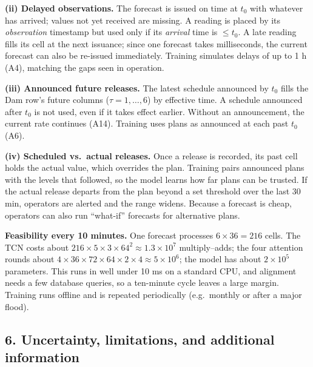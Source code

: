 \textbf{(ii) Delayed observations.} The forecast is issued on time at $t_0$ with whatever has arrived; values not yet received are missing. A reading is placed by its \emph{observation} timestamp but used only if its \emph{arrival} time is $\le t_0$. A late reading fills its cell at the next issuance; since one forecast takes milliseconds, the current forecast can also be re-issued immediately. Training simulates delays of up to 1 h (A4), matching the gaps seen in operation.

\textbf{(iii) Announced future releases.} The latest schedule announced by $t_0$ fills the Dam row's future columns ($\tau=1,\dots,6$) by effective time. A schedule announced after $t_0$ is not used, even if it takes effect earlier. Without an announcement, the current rate continues (A14). Training uses plans as announced at each past $t_0$ (A6).

\textbf{(iv) Scheduled vs.\ actual releases.} Once a release is recorded, its past cell holds the actual value, which overrides the plan. Training pairs announced plans with the levels that followed, so the model learns how far plans can be trusted. If the actual release departs from the plan beyond a set threshold over the last 30 min, operators are alerted and the range widens. Because a forecast is cheap, operators can also run ``what-if'' forecasts for alternative plans.

\textbf{Feasibility every 10 minutes.} One forecast processes $6\times36=216$ cells. The TCN costs about $216\times5\times3\times64^2\approx1.3\times10^{7}$ multiply--adds; the four attention rounds about $4\times36\times72\times64\times2\times4\approx5\times10^{6}$; the model has about $2\times10^{5}$ parameters. This runs in well under 10 ms on a standard CPU, and alignment needs a few database queries, so a ten-minute cycle leaves a large margin. Training runs offline and is repeated periodically (e.g.\ monthly or after a major flood).

\subsection*{6. Uncertainty, limitations, and additional information}


